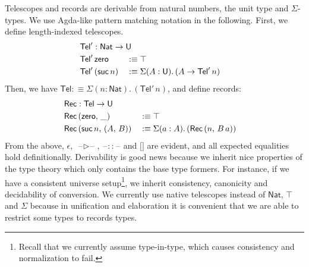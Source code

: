 \documentclass[acmsmall,review,anonymous,prologue,dvipsnames]{acmart}\settopmatter{printfolios=true,printccs=false,printacmref=false}
\renewcommand{\U}{\mathsf{U}}
\newcommand{\blank}{\mathord{\hspace{1pt}\text{--}\hspace{1pt}}}
\newcommand{\Nat}{\mathsf{Nat}}
\newcommand{\zero}{\mathsf{zero}}
\newcommand{\suc}{\mathsf{suc}}
\newcommand{\Tel}{\mathsf{Tel}}
\newcommand{\TCons}{\triangleright}
\newcommand{\Rec}{\mathsf{Rec}}
\theoremstyle{remark}
\begin{document}
Telescopes and records are derivable from natural numbers, the unit type and
$\Sigma$-types. We use Agda-like pattern matching notation in the following.
First, we define length-indexed telescopes.
\begin{alignat*}{3}
  & \rlap{$\Tel' : \Nat \to \U$}\\
  & \Tel'\,\zero      && :\equiv \top\\
  & \Tel'\,(\suc\,n)  && :\equiv \Sigma(A : \U).\,(A \to \Tel'\,n)
\end{alignat*}
Then, we have $\Tel :\equiv \Sigma(n : \Nat).\,(\Tel'\,n)$, and define records:
\begin{alignat*}{3}
  & \rlap{$\Rec : \Tel \to \U$}\\
  & \Rec\,(\zero,\,\_)        &&:\equiv \top\\
  & \Rec\,(\suc\,n,\,(A,\,B)) &&:\equiv \Sigma(a : A).\,(\Rec\,(n,\,B\,a))
\end{alignat*}
From the above, $\epsilon$, $\blank\TCons\blank$, $\blank::\blank$ and ${[}{]}$
are evident, and all expected equalities hold definitionally. Derivability is
good news because we inherit nice properties of the type theory which only
contains the base type formers. For instance, if we have a consistent universe
setup\footnote{Recall that we currently assume type-in-type, which causes consistency and normalization to fail.}, we inherit consistency, canonicity and decidability of conversion. We
currently use native telescopes instead of $\Nat$, $\top$ and $\Sigma$ because
in unification and elaboration it is convenient that we are able to restrict
some types to records types.
\end{document}
